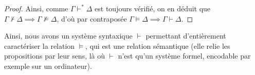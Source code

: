 \begin{proof}
  Ainsi, comme $\Gamma\vdash^*\Delta$ est toujours vérifié, on en déduit que
  $\Gamma\nvdash\Delta\implies\Gamma\nvDash\Delta$, d'où par contraposée
  $\Gamma\vDash\Delta\implies\Gamma\vdash\Delta$.
\end{proof}

Ainsi, nous avons un système syntaxique $\vdash$ permettant d'entièrement
caractériser la relation $\vDash$, qui est une relation sémantique (elle relie
les propositions par leur sens, là où $\vdash$ n'est qu'un système formel,
encodable par exemple sur un ordinateur).

